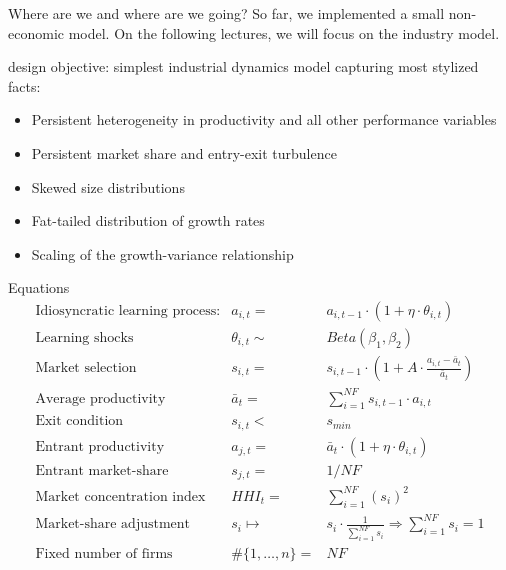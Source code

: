 \documentclass[bigger,aspectratio=169]{beamer}
\begin{document}
\begin{frame}[label={sec:org579fbd7}]{Where are we and where are we going?}
So far, we implemented a small non-economic model.
On the following lectures, we will focus on the \alert{industry model}.

\textcite{dosi_2017_footprint} design objective: simplest industrial dynamics model capturing most \alert{stylized facts}:
\begin{itemize}
\item Persistent heterogeneity in productivity and all other performance variables
\item Persistent market share and entry-exit turbulence
\item Skewed size distributions
\item Fat-tailed distribution of growth rates
\item Scaling of the growth-variance relationship
\end{itemize}
\end{frame}
\begin{frame}[label={sec:org5e3ddac}]{Equations}
\[ \begin{array}{lrl}
\mbox{Idiosyncratic learning process:} & a_{i,t} = &a_{i,t-1}\cdot (1 + \eta\cdot\theta_{i,t})\\
\mbox{Learning shocks} & \theta_{i,t} \sim  & Beta(\beta_1, \beta_2)\\
\mbox{Market selection} & s_{i,t} =  & s_{i,t-1} \cdot \left( 1 + A\cdot\frac{a_{i,t} - \bar{a}_{t}}{\bar{a}_{t}}\right) \\
\mbox{Average productivity} & \bar{a}_{t} =  & \sum_{i=1}^{NF} s_{i, t-1}\cdot a_{i,t} \\
\mbox{Exit condition} & s_{i,t} < & s_{min}\\
\mbox{Entrant productivity} & a_{j,t} =&  \bar{a}_{t}\cdot (1 + \eta\cdot\theta_{i,t})\\
\mbox{Entrant market-share} & s_{j,t} =& 1/NF \\
\mbox{Market concentration index} & HHI_{t} =& \sum_{i=1}^{NF} (s_{i})^2 \\
\mbox{Market-share adjustment} &  s_{i} \mapsto & s_{i}\cdot \frac{1}{\sum_{i=1}^{NF} s_{i}} \Rightarrow \sum_{i=1}^{NF} s_{i} = 1 \\
\mbox{Fixed number of firms} & \#\{1, \ldots, n\} =& NF
\end{array}\]
\end{frame}
\end{document}
